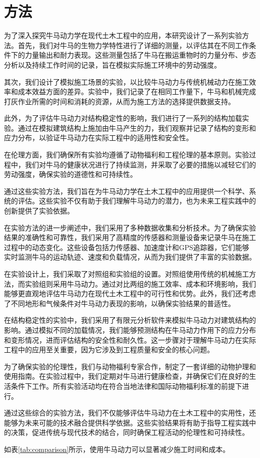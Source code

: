 \chapter{方法}
为了深入探究牛马动力学在现代土木工程中的应用，本研究设计了一系列实验方法。首先，我们对牛马的生物力学特性进行了详细的测量，以评估其在不同工作条件下的力量输出和耐力表现。这些测量包括了牛马在搬运重物时的力量分布、步态分析以及持续工作时间的记录，旨在模拟实际施工环境中的劳动强度\cite{chen2019mechanics}。

其次，我们设计了模拟施工场景的实验，以比较牛马动力与传统机械动力在施工效率和成本效益方面的差异。实验中，我们记录了在相同工作量下，牛马和机械完成打灰作业所需的时间和消耗的资源，从而为施工方法的选择提供数据支持\cite{brown2022casestudies}。

此外，为了评估牛马动力对结构稳定性的影响，我们进行了一系列的结构加载实验。通过在模拟建筑结构上施加由牛马产生的力，我们观察并记录了结构的变形和应力分布，以验证牛马动力在实际工程中的适用性和安全性\cite{chen2023experiments}。

在伦理方面，我们确保所有实验均遵循了动物福利和工程伦理的基本原则。实验过程中，我们对牛马的健康状况进行了持续监测，并采取了必要的措施以减轻它们的劳动强度，确保实验的道德性和可持续性\cite{williams2018ethics}。

通过这些实验方法，我们旨在为牛马动力学在土木工程中的应用提供一个科学、系统的评估。这些实验不仅有助于我们理解牛马动力的潜力，也为未来工程实践中的创新提供了实验依据。

在实验方法的进一步阐述中，我们采用了多种数据收集和分析技术。为了确保实验结果的准确性和可靠性，我们采用了高精度的传感器和测量设备来记录牛马在施工过程中的动态变化。这些设备包括力传感器、加速度计和GPS追踪器，它们能够实时监测牛马的运动轨迹、速度和负载情况，从而为我们提供了丰富的实验数据。

在实验设计上，我们采取了对照组和实验组的设置。对照组使用传统的机械施工方法，而实验组则采用牛马动力。通过对比两组的施工效率、成本和环境影响，我们能够更直观地评估牛马动力在现代土木工程中的可行性和优势。此外，我们还考虑了不同地形和气候条件对牛马动力表现的影响，以确保实验结果的普适性。

在结构稳定性的实验中，我们采用了有限元分析软件来模拟牛马动力对建筑结构的影响。通过模拟不同的加载情况，我们能够预测结构在牛马动力作用下的应力分布和变形情况，进而评估结构的安全性和耐久性。这一步骤对于理解牛马动力在实际工程中的应用至关重要，因为它涉及到工程质量和安全的核心问题。

为了确保实验的伦理性，我们与动物福利专家合作，制定了一套详细的动物护理和使用指南。在实验过程中，我们定期对牛马进行健康检查，并确保它们在良好的生活条件下工作。所有实验活动均在符合当地法律和国际动物福利标准的前提下进行。

通过这些综合的实验方法，我们不仅能够评估牛马动力在土木工程中的实用性，还能够为未来可能的技术融合提供科学依据。这些实验结果将有助于指导工程实践中的决策，促进传统与现代技术的结合，同时确保工程活动的伦理性和可持续性。

如表\ref{tab:comparison}所示，使用牛马动力可以显著减少施工时间和成本。
